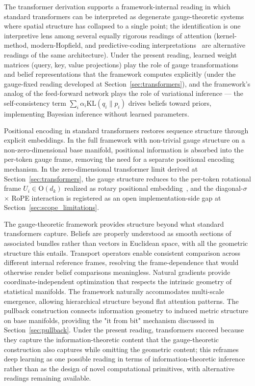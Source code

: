 \documentclass[11pt]{article}
\begin{document}
The transformer derivation supports a framework-internal reading in which standard transformers can be interpreted as degenerate gauge-theoretic systems where spatial structure has collapsed to a single point; the identification is one interpretive lens among several equally rigorous readings of attention (kernel-method, modern-Hopfield, and predictive-coding interpretations~\cite{tsai2019transformer, ramsauer2021hopfield, millidge2021predictive} are alternative readings of the same architecture). Under the present reading, learned weight matrices (query, key, value projections) play the role of gauge transformations and belief representations that the framework computes explicitly (under the gauge-fixed reading developed at Section~\ref{sec:transformers}), and the framework's analog of the feed-forward network plays the role of variational inference --- the self-consistency term $\sum_i \alpha_i \mathrm{KL}(q_i \| p_i)$ drives beliefs toward priors, implementing Bayesian inference without learned parameters.

Positional encoding in standard transformers restores sequence structure through explicit embeddings. In the full framework with non-trivial gauge structure on a non-zero-dimensional base manifold, positional information is absorbed into the per-token gauge frame, removing the need for a separate positional encoding mechanism. In the zero-dimensional transformer limit derived at Section~\ref{sec:transformers}, the gauge structure reduces to the per-token rotational frame $U_i \in \mathrm{O}(d_k)$ realized as rotary positional embedding~\cite{su2024roformer}, and the diagonal-$\sigma$ $\times$ RoPE interaction is registered as an open implementation-side gap at Section~\ref{sec:scope_limitations}.

The gauge-theoretic framework provides structure beyond what standard transformers capture. Beliefs are properly understood as smooth sections of associated bundles rather than vectors in Euclidean space, with all the geometric structure this entails. Transport operators enable consistent comparison across different internal reference frames, resolving the frame-dependence that would otherwise render belief comparisons meaningless. Natural gradients provide coordinate-independent optimization that respects the intrinsic geometry of statistical manifolds. The framework naturally accommodates multi-scale emergence, allowing hierarchical structure beyond flat attention patterns. The pullback construction connects information geometry to induced metric structure on base manifolds, providing the "it from bit" mechanism discussed in Section~\ref{sec:pullback}. Under the present reading, transformers succeed because they capture the information-theoretic content that the gauge-theoretic construction also captures while omitting the geometric content; this reframes deep learning as one possible reading in terms of information-theoretic inference rather than as the design of novel computational primitives, with alternative readings remaining available.
\end{document}
